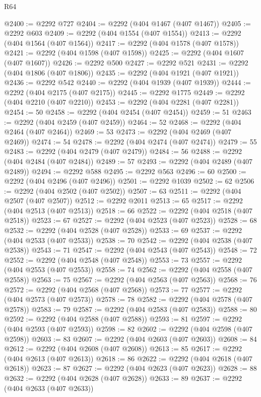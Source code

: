 \begin{lexlean}{R64}
\begin{coremodule}
@2400 := @2292 @727
@2404 := @2292 (@404 @1467 (@407 @1467))
@2405 := @2292 @603
@2409 := @2292 (@404 @1554 (@407 @1554))
@2413 := @2292 (@404 @1564 (@407 @1564))
@2417 := @2292 (@404 @1578 (@407 @1578))
@2421 := @2292 (@404 @1598 (@407 @1598))
@2425 := @2292 (@404 @1607 (@407 @1607))
@2426 := @2292 @500
@2427 := @2292 @521
@2431 := @2292 (@404 @1806 (@407 @1806))
@2435 := @2292 (@404 @1921 (@407 @1921))
@2436 := @2292 @542
@2440 := @2292 (@404 @1939 (@407 @1939))
@2444 := @2292 (@404 @2175 (@407 @2175))
@2445 := @2292 @1775
@2449 := @2292 (@404 @2210 (@407 @2210))
@2453 := @2292 (@404 @2281 (@407 @2281))
@2454 := 50
@2458 := @2292 (@404 @2454 (@407 @2454))
@2459 := 51
@2463 := @2292 (@404 @2459 (@407 @2459))
@2464 := 52
@2468 := @2292 (@404 @2464 (@407 @2464))
@2469 := 53
@2473 := @2292 (@404 @2469 (@407 @2469))
@2474 := 54
@2478 := @2292 (@404 @2474 (@407 @2474))
@2479 := 55
@2483 := @2292 (@404 @2479 (@407 @2479))
@2484 := 56
@2488 := @2292 (@404 @2484 (@407 @2484))
@2489 := 57
@2493 := @2292 (@404 @2489 (@407 @2489))
@2494 := @2292 @588
@2495 := @2292 @563
@2496 := 60
@2500 := @2292 (@404 @2496 (@407 @2496))
@2501 := @2292 @1039
@2502 := 62
@2506 := @2292 (@404 @2502 (@407 @2502))
@2507 := 63
@2511 := @2292 (@404 @2507 (@407 @2507))
@2512 := @2292 @2011
@2513 := 65
@2517 := @2292 (@404 @2513 (@407 @2513))
@2518 := 66
@2522 := @2292 (@404 @2518 (@407 @2518))
@2523 := 67
@2527 := @2292 (@404 @2523 (@407 @2523))
@2528 := 68
@2532 := @2292 (@404 @2528 (@407 @2528))
@2533 := 69
@2537 := @2292 (@404 @2533 (@407 @2533))
@2538 := 70
@2542 := @2292 (@404 @2538 (@407 @2538))
@2543 := 71
@2547 := @2292 (@404 @2543 (@407 @2543))
@2548 := 72
@2552 := @2292 (@404 @2548 (@407 @2548))
@2553 := 73
@2557 := @2292 (@404 @2553 (@407 @2553))
@2558 := 74
@2562 := @2292 (@404 @2558 (@407 @2558))
@2563 := 75
@2567 := @2292 (@404 @2563 (@407 @2563))
@2568 := 76
@2572 := @2292 (@404 @2568 (@407 @2568))
@2573 := 77
@2577 := @2292 (@404 @2573 (@407 @2573))
@2578 := 78
@2582 := @2292 (@404 @2578 (@407 @2578))
@2583 := 79
@2587 := @2292 (@404 @2583 (@407 @2583))
@2588 := 80
@2592 := @2292 (@404 @2588 (@407 @2588))
@2593 := 81
@2597 := @2292 (@404 @2593 (@407 @2593))
@2598 := 82
@2602 := @2292 (@404 @2598 (@407 @2598))
@2603 := 83
@2607 := @2292 (@404 @2603 (@407 @2603))
@2608 := 84
@2612 := @2292 (@404 @2608 (@407 @2608))
@2613 := 85
@2617 := @2292 (@404 @2613 (@407 @2613))
@2618 := 86
@2622 := @2292 (@404 @2618 (@407 @2618))
@2623 := 87
@2627 := @2292 (@404 @2623 (@407 @2623))
@2628 := 88
@2632 := @2292 (@404 @2628 (@407 @2628))
@2633 := 89
@2637 := @2292 (@404 @2633 (@407 @2633))

\end{coremodule}
\end{lexlean}
